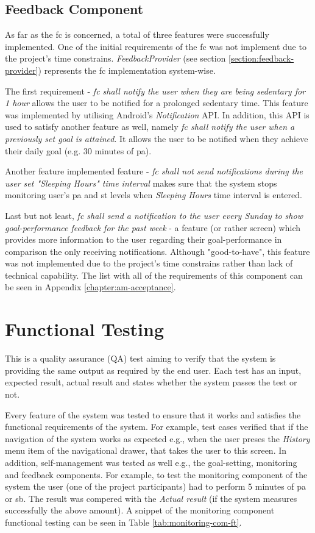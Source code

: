 \subsection{Feedback Component}
As far as the \gls{fc} is concerned, a total of three features were successfully implemented. One of the initial requirements of the \gls{fc} was not implement due to the project's time constrains. \textit{FeedbackProvider} (see section \ref{section:feedback-provider}) represents the \gls{fc} implementation system-wise.

The first requirement - \textit{\gls{fc} shall notify the user when they are being sedentary for 1 hour} allows the user to be notified for a prolonged sedentary time. This feature was implemented by utilising Android's \textit{Notification} API. In addition, this API is used to satisfy another feature as well, namely \textit{\gls{fc} shall notify the user when a previously set goal is attained}. It allows the user to be notified when they achieve their daily goal (e.g. 30 minutes of \gls{pa}).

Another feature implemented feature - \textit{\gls{fc} shall not send notifications during the user set "Sleeping Hours" time interval} makes sure that the system stops monitoring user's \gls{pa} and \gls{st} levels when \textit{Sleeping Hours} time interval is entered. 

Last but not least, \textit{\gls{fc} shall send a notification to the user every Sunday to show goal-performance feedback for the past week} - a feature (or rather screen) which provides more information to the user regarding their goal-performance in comparison the only receiving notifications. Although "good-to-have", this feature was not implemented due to the project's time constrains rather than lack of technical capability. The list with all of the requirements of this component can be seen in Appendix \ref{chapter:am-acceptance}.

\section{Functional Testing}
This is a quality assurance (QA) test aiming to verify that the system is providing the same output as required by the end user. Each test has an input, expected result, actual result and states whether the system passes the test or not.

Every feature of the system was tested to ensure that it works and satisfies the functional requirements of the system. For example, test cases verified that if the navigation of the system works as expected e.g., when the user preses the \textit{History} menu item of the navigational drawer, that takes the user to this screen. In addition, self-management was tested as well e.g., the goal-setting, monitoring and feedback components. For example, to test the monitoring component of the system the user (one of the project participants) had to perform 5 minutes of \gls{pa} or \gls{sb}. The result was compered with the \textit{Actual result} (if the system measures successfully the above amount). A snippet of the monitoring component functional testing can be seen in Table \ref{tab:monitoring-com-ft}.

